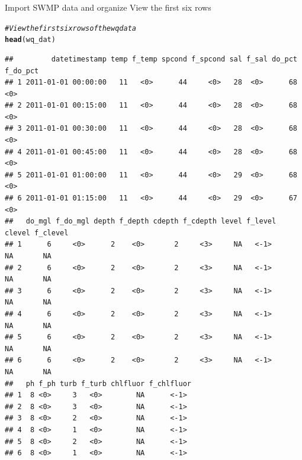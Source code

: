 \documentclass[xcolor=svgnames]{beamer}\usepackage[]{graphicx}\usepackage[]{color}
\makeatletter
\newcommand{\hlcom}[1]{\textcolor[rgb]{0.678,0.584,0.686}{\textit{#1}}}%
\newcommand{\hlstd}[1]{\textcolor[rgb]{0.345,0.345,0.345}{#1}}%
\newcommand{\hlkwd}[1]{\textcolor[rgb]{0.737,0.353,0.396}{\textbf{#1}}}%
\newenvironment{kframe}{%
 \def\at@end@of@kframe{}%
 \ifinner\ifhmode%
  \def\at@end@of@kframe{\end{minipage}}%
  \begin{minipage}{\columnwidth}%
 \fi\fi%
 \def\FrameCommand##1{\hskip\@totalleftmargin \hskip-\fboxsep
 \colorbox{shadecolor}{##1}\hskip-\fboxsep
     \hskip-\linewidth \hskip-\@totalleftmargin \hskip\columnwidth}%
 \MakeFramed {\advance\hsize-\width
   \@totalleftmargin\z@ \linewidth\hsize
   \@setminipage}}%
 {\par\unskip\endMakeFramed%
 \at@end@of@kframe}
\newenvironment{knitrout}{}{} %
\makeatother
\begin{document}
\begin{frame}{Import SWMP data and organize}
View the first six rows
\begin{knitrout}\scriptsize
{}\color{fgcolor}\begin{kframe}
\begin{alltt}
\hlcom{# View the first six rows of the wq data}
\hlkwd{head}\hlstd{(wq_dat)}
\end{alltt}
\begin{verbatim}
##         datetimestamp temp f_temp spcond f_spcond sal f_sal do_pct f_do_pct
## 1 2011-01-01 00:00:00   11   <0>      44     <0>   28  <0>      68     <0> 
## 2 2011-01-01 00:15:00   11   <0>      44     <0>   28  <0>      68     <0> 
## 3 2011-01-01 00:30:00   11   <0>      44     <0>   28  <0>      68     <0> 
## 4 2011-01-01 00:45:00   11   <0>      44     <0>   28  <0>      68     <0> 
## 5 2011-01-01 01:00:00   11   <0>      44     <0>   29  <0>      68     <0> 
## 6 2011-01-01 01:15:00   11   <0>      44     <0>   29  <0>      67     <0> 
##   do_mgl f_do_mgl depth f_depth cdepth f_cdepth level f_level clevel f_clevel
## 1      6     <0>      2    <0>       2     <3>     NA   <-1>      NA       NA
## 2      6     <0>      2    <0>       2     <3>     NA   <-1>      NA       NA
## 3      6     <0>      2    <0>       2     <3>     NA   <-1>      NA       NA
## 4      6     <0>      2    <0>       2     <3>     NA   <-1>      NA       NA
## 5      6     <0>      2    <0>       2     <3>     NA   <-1>      NA       NA
## 6      6     <0>      2    <0>       2     <3>     NA   <-1>      NA       NA
##   ph f_ph turb f_turb chlfluor f_chlfluor
## 1  8 <0>     3   <0>        NA      <-1> 
## 2  8 <0>     3   <0>        NA      <-1> 
## 3  8 <0>     2   <0>        NA      <-1> 
## 4  8 <0>     1   <0>        NA      <-1> 
## 5  8 <0>     2   <0>        NA      <-1> 
## 6  8 <0>     1   <0>        NA      <-1>
\end{verbatim}
\end{kframe}
\end{knitrout}
\end{frame}
\end{document}
